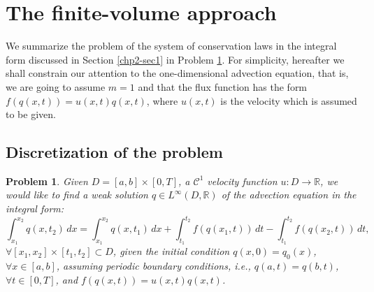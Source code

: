 \section{The finite-volume approach}
\label{chp2-sec2}
We summarize the problem of the system of conservation laws in the integral form 
discussed in Section \ref{chp2-sec1} in Problem \ref{chp2-sec2-prob1}.
For simplicity, hereafter we shall constrain our attention to the one-dimensional advection equation, 
that is, we are going to assume $m=1$ and that the flux function has the form 
$f(q(x,t)) = u(x,t)q(x,t)$, where $u(x,t)$ is the velocity which is assumed to be given.

\subsection{Discretization of the problem}
\theoremstyle{plain} 
\newtheorem{prob}{Problem}[chapter]

\begin{prob}
	\label{chp2-sec2-prob1}
	Given $ D = [a,b] \times [0,T]$, a $\mathcal{C}^1$ velocity function ${u}: D \to \mathbb{R}$,
	we would like to find a weak solution ${q} \in L^{\infty}(D, \mathbb{R})$ 
	of the advection equation in the integral form:
	\begin{equation*}
	        \int_{x_1}^{x_2} {q}(x, t_2) \,dx = 
       		\int_{x_1}^{x_2} {q}(x, t_1) \,dx + 
        	\int_{t_1}^{t_2} {f}({q}(x_1, t)) \,dt -
		\int_{t_1}^{t_2}{f}({q}(x_2, t)) \,dt ,
	\end{equation*}
	$\forall [x_1, x_2]\times[t_1, t_2] \subset D$, 
	given the initial condition 
	${q}(x,0) = {q}_0(x)$, $\forall x \in [a,b]$, 
	assuming periodic boundary conditions, 
	\textit{i.e.}, ${q}(a,t) = {q}(b,t)$, $\forall t \in [0,T]$,
	and $f(q(x,t)) = u(x,t)q(x,t)$.
\end{prob}

